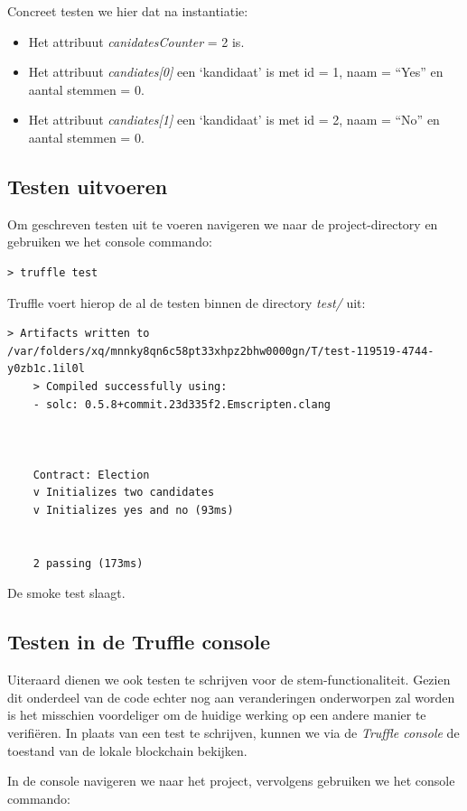 	Concreet testen we hier dat na instantiatie:
	\begin{itemize}
		\item Het attribuut \textit{canidatesCounter} = 2 is.
		\item Het attribuut \textit{candiates[0]} een `kandidaat' is met id = 1, naam = ``Yes'' en aantal stemmen = 0.
		\item Het attribuut \textit{candiates[1]}  een `kandidaat' is met id = 2, naam = ``No'' en aantal stemmen = 0.
	\end{itemize}
	\subsection{Testen uitvoeren}
	Om geschreven testen uit te voeren navigeren we naar de project-directory en gebruiken we het console commando:
	
	\begin{lstlisting}[numbers=none]
	> truffle test
	\end{lstlisting}
	
	Truffle voert hierop de al de testen binnen de directory \textit{test\slash} uit:
	
	\begin{lstlisting}[numbers=none]
	> Artifacts written to /var/folders/xq/mnnky8qn6c58pt33xhpz2bhw0000gn/T/test-119519-4744-y0zb1c.1il0l
	> Compiled successfully using:
	- solc: 0.5.8+commit.23d335f2.Emscripten.clang
	
	
	
	Contract: Election
	v Initializes two candidates
	v Initializes yes and no (93ms)
	
	
	2 passing (173ms)
	\end{lstlisting}
	
	De smoke test slaagt.
	
	\subsection{Testen in de Truffle console}
	Uiteraard dienen we  ook testen te schrijven voor de stem-functionaliteit. Gezien dit onderdeel van de code echter nog aan veranderingen onderworpen zal worden is het misschien voordeliger om de huidige werking op een andere manier te verifiëren. In plaats van een test te schrijven, kunnen we via de \textit{Truffle console} de toestand van de lokale blockchain bekijken.
	
	In de console navigeren we naar het project, vervolgens gebruiken we het console commando:
	
